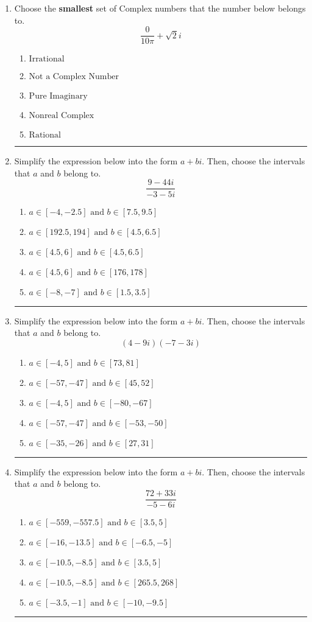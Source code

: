 \documentclass[14pt]{extbook}
\newcommand{\litem}[1]{\item#1\hspace*{-1cm}\rule{\textwidth}{0.4pt}}
\begin{document}
\begin{enumerate}
\litem{
Choose the \textbf{smallest} set of Complex numbers that the number below belongs to.\[ \frac{0}{10 \pi}+\sqrt{2}i \]\begin{enumerate}[label=\Alph*.]
\item \( \text{Irrational} \)
\item \( \text{Not a Complex Number} \)
\item \( \text{Pure Imaginary} \)
\item \( \text{Nonreal Complex} \)
\item \( \text{Rational} \)

\end{enumerate} }
\litem{
Simplify the expression below into the form $a+bi$. Then, choose the intervals that $a$ and $b$ belong to.\[ \frac{9 - 44 i}{-3 - 5 i} \]\begin{enumerate}[label=\Alph*.]
\item \( a \in [-4, -2.5] \text{ and } b \in [7.5, 9.5] \)
\item \( a \in [192.5, 194] \text{ and } b \in [4.5, 6.5] \)
\item \( a \in [4.5, 6] \text{ and } b \in [4.5, 6.5] \)
\item \( a \in [4.5, 6] \text{ and } b \in [176, 178] \)
\item \( a \in [-8, -7] \text{ and } b \in [1.5, 3.5] \)

\end{enumerate} }
\litem{
Simplify the expression below into the form $a+bi$. Then, choose the intervals that $a$ and $b$ belong to.\[ (4 - 9 i)(-7 - 3 i) \]\begin{enumerate}[label=\Alph*.]
\item \( a \in [-4, 5] \text{ and } b \in [73, 81] \)
\item \( a \in [-57, -47] \text{ and } b \in [45, 52] \)
\item \( a \in [-4, 5] \text{ and } b \in [-80, -67] \)
\item \( a \in [-57, -47] \text{ and } b \in [-53, -50] \)
\item \( a \in [-35, -26] \text{ and } b \in [27, 31] \)

\end{enumerate} }
\litem{
Simplify the expression below into the form $a+bi$. Then, choose the intervals that $a$ and $b$ belong to.\[ \frac{72 + 33 i}{-5 - 6 i} \]\begin{enumerate}[label=\Alph*.]
\item \( a \in [-559, -557.5] \text{ and } b \in [3.5, 5] \)
\item \( a \in [-16, -13.5] \text{ and } b \in [-6.5, -5] \)
\item \( a \in [-10.5, -8.5] \text{ and } b \in [3.5, 5] \)
\item \( a \in [-10.5, -8.5] \text{ and } b \in [265.5, 268] \)
\item \( a \in [-3.5, -1] \text{ and } b \in [-10, -9.5] \)


\end{enumerate}}
\end{enumerate}
\end{document}
